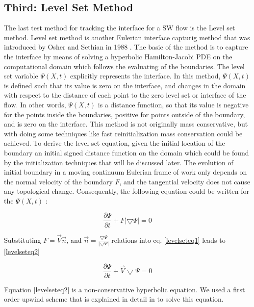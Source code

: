 \documentclass[letterpaper,10pt]{article}
\begin{document}
\subsection{Third: Level Set Method} \label{level set}

The last test method for tracking the interface for a SW flow is the Level set method.
Level set method is another Eulerian interface capturig method that was introduced by Osher and Sethian in 1988 \cite{Osher1988}.
The basic of the method is to capture the interface by means of solving a hyperbolic Hamilton-Jacobi PDE on 
the computational domain which follows the evaluating of the boundaries. The level set variable $\varPsi (X,t)$ explicitly 
represents the interface. In this method, $\varPsi (X,t)$ is defined such that its value is zero on the interface, and 
changes in the domain with respect to the distance of each point to the zero level set or interface of the flow. 
In other words, $\varPsi (X,t)$  is a distance function, so that its value is negative for the points inside the boundaries, 
positive for points outside of the boundary, and is zero on the interface. 
This method is not originally mass conservative, but with doing some 
techniques like fast reinitialization mass conservation could be achieved. 
To derive the level set equation, given the initial location of the boundary an initial signed distance function on 
the domain which could be found by the initialization techniques that will be discussed later. The evolution of initial 
boundary in a moving continuum Eulerian frame of work only depends on the normal velocity of the boundary $F$, 
and the tangential velocity does not cause any topological change. Consequently, the following equation could 
be written for the $\varPsi (X,t)$ :

\begin{equation}\label{levelseteq1}
 \frac{\partial \varPsi}{\partial t} + F |\bigtriangledown \varPsi| = 0
\end{equation}

Substituting $F = \overrightarrow{V} \overrightarrow{n} $, and 
$\overrightarrow{n} = \frac{\bigtriangledown \varPsi}{|\bigtriangledown \varPsi|}$
relations into eq. \eqref{levelseteq1} leads to \eqref{levelseteq2}

\begin{equation}\label{levelseteq2}
 \frac{\partial \varPsi}{\partial t} + \overrightarrow{V} \bigtriangledown \varPsi = 0
\end{equation}

Equation \eqref{levelseteq2} is a non-conservative hyperbolic equation. We used a first order upwind scheme  that is explained in detail in \cite{} to solve this equation. 
\end{document}
